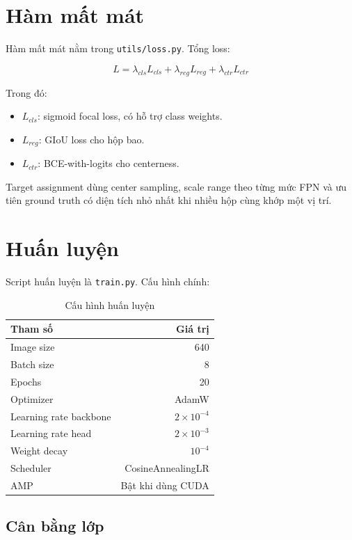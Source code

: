 \documentclass[12pt,a4paper]{article}
\begin{document}
\section{Hàm mất mát}

Hàm mất mát nằm trong \texttt{utils/loss.py}. Tổng loss:

\begin{equation}
L = \lambda_{cls} L_{cls} + \lambda_{reg} L_{reg} + \lambda_{ctr} L_{ctr}
\end{equation}

Trong đó:

\begin{itemize}
  \item \(L_{cls}\): sigmoid focal loss, có hỗ trợ class weights.
  \item \(L_{reg}\): GIoU loss cho hộp bao.
  \item \(L_{ctr}\): BCE-with-logits cho centerness.
\end{itemize}

Target assignment dùng center sampling, scale range theo từng mức FPN và ưu tiên ground truth có diện tích nhỏ nhất khi nhiều hộp cùng khớp một vị trí.

\section{Huấn luyện}

Script huấn luyện là \texttt{train.py}. Cấu hình chính:

\begin{table}[h]
\centering
\caption{Cấu hình huấn luyện}
\begin{tabular}{lr}
\toprule
Tham số & Giá trị \\
\midrule
Image size & 640 \\
Batch size & 8 \\
Epochs & 20 \\
Optimizer & AdamW \\
Learning rate backbone & \(2 \times 10^{-4}\) \\
Learning rate head & \(2 \times 10^{-3}\) \\
Weight decay & \(10^{-4}\) \\
Scheduler & CosineAnnealingLR \\
AMP & Bật khi dùng CUDA \\
\bottomrule
\end{tabular}
\end{table}

\subsection{Cân bằng lớp}
\end{document}
